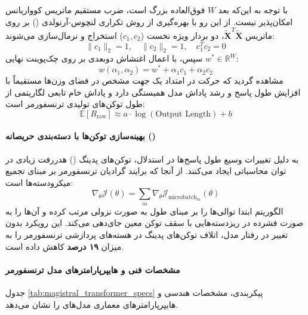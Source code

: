 با توجه به این‌که بعد $W$ فوق‌العاده بزرگ است، ضرب مستقیم ماتریس کوواریانس امکان‌پذیر نیست. از این رو با بهره‌گیری از روش تکراری لنچوس-آرنولدی () \cite{saad2003iterative} بر روی ماتریس $\tilde{\mathbf{X}}^T \tilde{\mathbf{X}}$، دو بردار ویژه نخست ($c_1, c_2$) استخراج و نرمال‌سازی می‌شوند:
\begin{equation}
    \|c_1\|_2 = 1, \quad \|c_2\|_2 = 1, \quad c_1^T c_2 = 0
\end{equation}
سپس، با اعمال اغتشاش دو‌بعدی بر روی چک‌پوینت نهایی $w^* \in \mathbb{R}^W$:
\begin{equation}
    w(\alpha_1, \alpha_2) = w^* + \alpha_1 c_1 + \alpha_2 c_2
\end{equation}
مشاهده گردید که حرکت در امتداد یک جهت مشخص در فضای وزن‌ها مستقیماً با افزایش طول پاسخ و رشد پاداش مدل همبستگی دارد و پاداش خام تابعی لگاریتمی از طول توکن‌های تولیدی ترنسفورمر است:
\begin{equation}
    \mathbb{E}[R_{\text{raw}}] \approx a \cdot \log(\text{Output Length}) + b
\end{equation}

\paragraph*{بهینه‌سازی توکن‌ها با دسته‌بندی حریصانه ()}
به دلیل تغییرات وسیع طول پاسخ‌ها در استدلال، توکن‌های پدینگ () هدررفت زیادی در توان محاسباتی ایجاد می‌کنند. از آنجا که برایند گرادیان ترنسفورمر بر مبنای تجمیع میکرودسته‌ها است:
\begin{equation}
    \nabla_\theta \mathcal{J}(\theta) = \sum_{m} \nabla_\theta \mathcal{J}_{\text{microbatch}_m}(\theta)
\end{equation}
الگوریتم  ابتدا توالی‌ها را بر مبنای طول به صورت نزولی مرتب کرده و آن‌ها را به صورت فشرده در ریزدسته‌هایی با سقف توکن معین جای‌دهی می‌کند. این رویکرد بدون تغییر در رفتار مدل، اتلاف توکن‌های پدینگ در هسته‌های پردازشی ترنسفورمر را به میزان \textbf{۱۹ درصد} کاهش داده است.

\paragraph*{مشخصات فنی و هایپرپارامترهای مدل ترنسفورمر }
جدول \ref{tab:magistral_transformer_specs} پیکربندی، مشخصات هندسی و هایپرپارامترهای معماری مدل‌های  را نشان می‌دهد.

